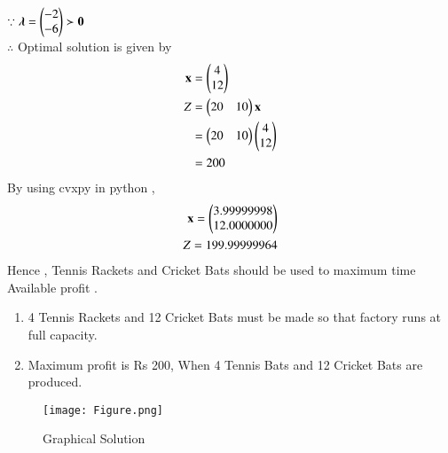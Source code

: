 \documentclass[journal,12pt,twocolumn]{IEEEtran}
\begin{document}
$\because \boldsymbol{\lambda}=\begin{pmatrix}-2 \\ -6\end{pmatrix} \succ \mathbf{0} $
\\
$\therefore$ Optimal solution is given by
\begin{align}
\mathbf{x} &= \begin{pmatrix}4\\12\end{pmatrix} \\
Z &= \begin{pmatrix}20 & 10\end{pmatrix}\mathbf{x} \\
&= \begin{pmatrix}20 & 10\end{pmatrix}\begin{pmatrix}4 \\ 12\end{pmatrix} \\
&= 200
\end{align}
By using cvxpy in python ,
\begin{align}
\mathbf{x}=\begin{pmatrix}3.99999998\\12.0000000\end{pmatrix}\\
Z = 199.99999964
\end{align}
Hence , Tennis Rackets and  Cricket Bats should be used to maximum time Available profit .
\begin{enumerate}
\item 4 Tennis Rackets and 12 Cricket Bats must be made so that factory runs at full capacity.
\item Maximum profit is Rs 200, When 4 Tennis Bats and 12 Cricket Bats are produced.
\end{enumerate}
\begin{figure}[!ht]
\centering
\texttt{[image: Figure.png]}
\caption{Graphical Solution}
\label{fig: Graphical Solution}	
\end{figure}
\end{document}
